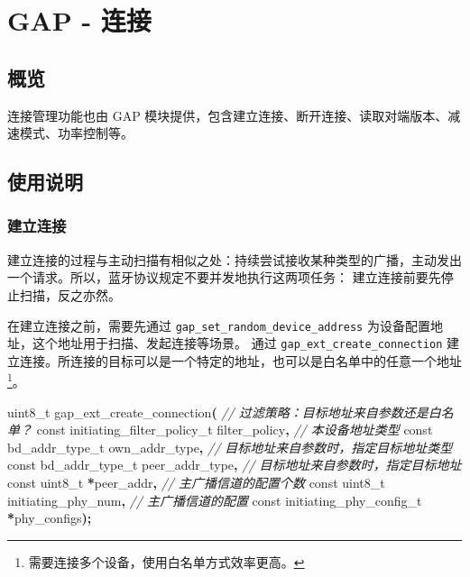 \documentclass[
  12pt,
]{book}
\newenvironment{Shaded}{\begin{snugshade}}{\end{snugshade}}
\newcommand{\CommentTok}[1]{\textcolor[rgb]{0.56,0.35,0.01}{\textit{#1}}}
\newcommand{\DataTypeTok}[1]{\textcolor[rgb]{0.13,0.29,0.53}{#1}}
\newcommand{\NormalTok}[1]{#1}
\newcommand{\OperatorTok}[1]{\textcolor[rgb]{0.81,0.36,0.00}{\textbf{#1}}}
\begin{document}
\hypertarget{ch-conn}{%
\chapter{GAP - 连接}\label{ch-conn}}

\hypertarget{ux6982ux89c8-2}{%
\section{概览}\label{ux6982ux89c8-2}}

连接管理功能也由 GAP 模块提供，包含建立连接、断开连接、读取对端版本、减速模式、功率控制等。

\hypertarget{ux4f7fux7528ux8bf4ux660e-2}{%
\section{使用说明}\label{ux4f7fux7528ux8bf4ux660e-2}}

\hypertarget{ch-scan-create-connection}{%
\subsection{建立连接}\label{ch-scan-create-connection}}

建立连接的过程与主动扫描有相似之处：持续尝试接收某种类型的广播，主动发出一个请求。所以，蓝牙协议规定不要并发地执行这两项任务：
建立连接前要先停止扫描，反之亦然。

在建立连接之前，需要先通过 \texttt{gap\_set\_random\_device\_address} 为设备配置地址，这个地址用于扫描、发起连接等场景。
通过 \texttt{gap\_ext\_create\_connection} 建立连接。所连接的目标可以是一个特定的地址，也可以是白名单中的任意一个地址\footnote{需要连接多个设备，使用白名单方式效率更高。}。

\begin{Shaded}
\begin{Highlighting}[]
\DataTypeTok{uint8\_t}\NormalTok{ gap\_ext\_create\_connection}\OperatorTok{(}
  \CommentTok{// 过滤策略：目标地址来自参数还是白名单？}
  \DataTypeTok{const}\NormalTok{ initiating\_filter\_policy\_t filter\_policy}\OperatorTok{,}
  \CommentTok{// 本设备地址类型}
  \DataTypeTok{const}\NormalTok{ bd\_addr\_type\_t own\_addr\_type}\OperatorTok{,}
  \CommentTok{// 目标地址来自参数时，指定目标地址类型}
  \DataTypeTok{const}\NormalTok{ bd\_addr\_type\_t peer\_addr\_type}\OperatorTok{,}
  \CommentTok{// 目标地址来自参数时，指定目标地址}
  \DataTypeTok{const} \DataTypeTok{uint8\_t} \OperatorTok{*}\NormalTok{peer\_addr}\OperatorTok{,}
  \CommentTok{// 主广播信道的配置个数}
  \DataTypeTok{const} \DataTypeTok{uint8\_t}\NormalTok{ initiating\_phy\_num}\OperatorTok{,}
  \CommentTok{// 主广播信道的配置}
  \DataTypeTok{const}\NormalTok{ initiating\_phy\_config\_t }\OperatorTok{*}\NormalTok{phy\_configs}\OperatorTok{);}
\end{Highlighting}
\end{Shaded}
\end{document}
